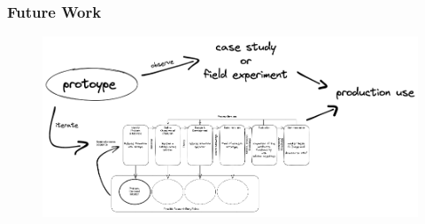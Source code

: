 \documentclass{beamer}
\begin{document}
\begin{frame}
\frametitle{Future Work}

\begin{figure}[h]
	\centering
	\includegraphics[width=1.0\linewidth]{assets/future-work-gitops-thesis.png}
	\label{fig:futureWorkGitopsThesis}	
\end{figure}


\end{frame}




\end{document}
